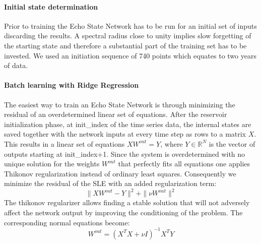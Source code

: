\paragraph*{Initial state determination}
Prior to training the Echo State Network has to be run for an initial set of inputs discarding the results. A spectral radius close to unity implies slow forgetting of the starting state and therefore a substantial part of the training set has to be invested. We used an initiation sequence of 740 points which equates to two years of data.

\paragraph*{Batch learning with Ridge Regression}
The easiest way to train an Echo State Network is through minimizing the residual of an overdetermined linear set of equations. After the reservoir initialization phase, at init\_index of the time series data, the internal states are saved together with the network inputs at every time step as rows to a matrix $X$. This results in a linear set of equations $XW^{out}=Y$, where $Y \in \mathbb{R}^N$ is the vector of outputs starting at init\_index+1. Since the system is overdetermined with no unique solution for the weights $W^{out}$ that perfectly fits all equations one applies Thikonov regularization instead of ordinary least squares. Consequently we minimize the residual of the SLE with an added regularization term:\\
\begin{equation}
    \|XW^{out}-Y\|^2 + \|\nu W^{out}\|^2
\end{equation}
The thikonov regularizer allows finding a stable solution that will not adversely affect the network output by improving the conditioning of the problem. The corresponding normal equations become:
\begin{equation}
    W^{out}=(X^TX+\nu I)^{-1} X^TY
\end{equation}

